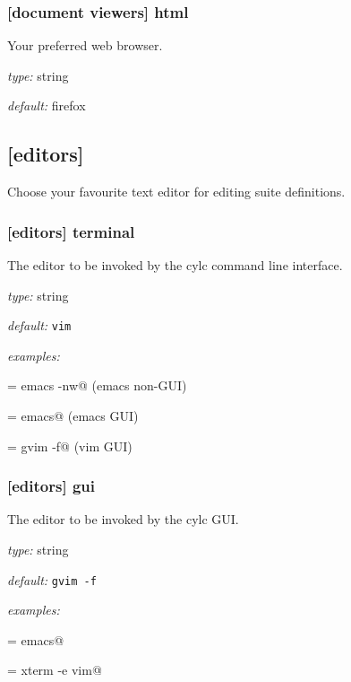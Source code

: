\subsubsection[html]{[document viewers] \textrightarrow html}

Your preferred web browser.

\begin{myitemize}
\item {\em type:} string
\item {\em default:} firefox
\end{myitemize}

\subsection{[editors]}

Choose your favourite text editor for editing suite definitions.

\subsubsection[terminal]{[editors] \textrightarrow terminal}

The editor to be invoked by the cylc command line interface.

\begin{myitemize}
\item {\em type:} string
\item {\em default:} \lstinline=vim=
\item {\em examples:}
    \begin{myitemize}
            \item \lstinline@terminal = emacs -nw@ (emacs non-GUI)
            \item \lstinline@terminal = emacs@ (emacs GUI)
            \item \lstinline@terminal = gvim -f@ (vim GUI)
    \end{myitemize}
\end{myitemize}

\subsubsection[gui]{[editors] \textrightarrow gui}

The editor to be invoked by the cylc GUI.

\begin{myitemize}
\item {\em type:} string
\item {\em default:} \lstinline=gvim -f=
\item {\em examples:}
    \begin{myitemize}
            \item \lstinline@gui = emacs@
            \item \lstinline@gui = xterm -e vim@
    \end{myitemize}
\end{myitemize}


